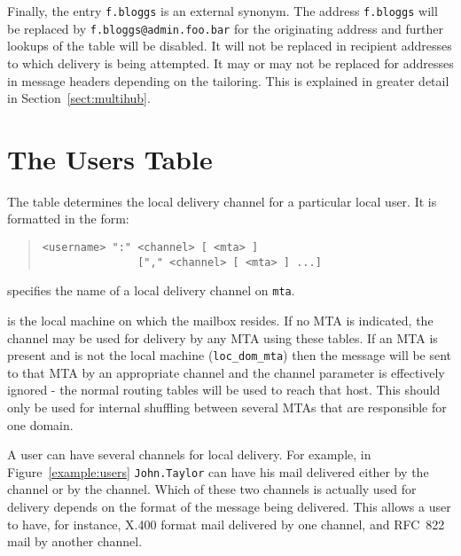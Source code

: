 Finally, the entry \verb|f.bloggs| is an external synonym. The address
\verb|f.bloggs| will be replaced by \verb|f.bloggs@admin.foo.bar|
for the originating address and further lookups of the 
table will be disabled.
It will not be replaced in recipient addresses to which delivery is being
attempted.
It may or may not be replaced for addresses in message headers
depending on the tailoring.
This is explained in greater detail in
Section~\ref{sect:multihub}.

\section{The Users Table}

The  table determines the local delivery channel for a
particular local user.  It is formatted in the form:

\begin{quote}\begin{verbatim}
<username> ":" <channel> [ <mta> ] 
               ["," <channel> [ <mta> ] ...]
\end{verbatim}\end{quote}

\begin{describe}
\item[\verb+Channel+:] specifies the name of a local delivery channel
on \verb+mta+.

\item[\verb+Mta+:] is the local machine on which the mailbox resides. 
If no MTA is indicated, the channel may be used for delivery by any
MTA using these tables. If an MTA is present and is not the local
machine (\verb|loc_dom_mta|) then the message will be sent to that MTA
by an appropriate channel and the channel parameter is effectively
ignored - the normal routing tables will be used to reach that host.
This should only be used for internal shuffling between several MTAs
that are responsible for one domain.

\end{describe}

A user can have several channels for local delivery.
For example, in Figure~\ref{example:users} \verb+John.Taylor+ can have
his mail delivered either by the  channel or by the
 channel. 
Which of these two channels is actually used for delivery depends on
the format of the message being delivered.
This allows a user to have, for instance, X.400 format mail delivered
by one channel, and RFC~822 mail by another channel.

